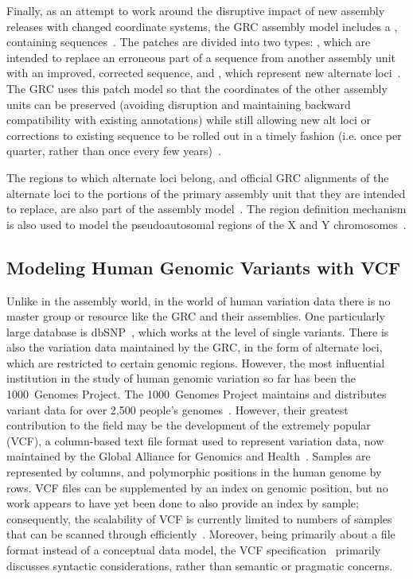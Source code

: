 Finally, as an attempt to work around the disruptive impact of new assembly releases with changed coordinate systems, the GRC assembly model includes a , containing  sequences~\cite{schneider2013genome}. The patches are divided into two types: , which are intended to replace an erroneous part of a sequence from another assembly unit with an improved, corrected sequence, and , which represent new alternate loci~\cite{schneider2013genome}. The GRC uses this patch model so that the coordinates of the other assembly units can be preserved (avoiding disruption and maintaining backward compatibility with existing annotations) while still allowing new alt loci or corrections to existing sequence to be rolled out in a timely fashion (i.e. once per quarter, rather than once every few years)~\cite{schneider2013genome}.

The regions to which alternate loci belong, and official GRC alignments of the alternate loci to the portions of the primary assembly unit that they are intended to replace, are also part of the assembly model~\cite{schneider2013genome}. The region definition mechanism is also used to model the pseudoautosomal regions of the X and Y chromosomes~\cite{schneider2013genome}.
    
\subsection{Modeling Human Genomic Variants with VCF}

Unlike in the assembly world, in the world of human variation data there is no master group or resource like the GRC and their assemblies. One particularly large database is dbSNP~\cite{sherry2001dbsnp}, which works at the level of single variants. There is also the variation data maintained by the GRC, in the form of alternate loci, which are restricted to certain genomic regions. However, the most influential institution in the study of human genomic variation so far has been the 1000~Genomes Project. The 1000~Genomes Project maintains and distributes variant data for over 2,500 people's genomes~\cite{sudmant2015integrated}. However, their greatest contribution to the field may be the development of the extremely popular  (VCF), a column-based text file format used to represent variation data, now maintained by the Global Alliance for Genomics and Health~\cite{danecek2011variant}. Samples are represented by columns, and polymorphic positions in the human genome by rows. VCF files can be supplemented by an index on genomic position, but no work appears to have yet been done to also provide an index by sample; consequently, the scalability of VCF is currently limited to numbers of samples that can be scanned through efficiently~\cite{danecek2011variant}. Moreover, being primarily about a file format instead of a conceptual data model, the VCF specification~\cite{marshall2013variant} primarily discusses syntactic considerations, rather than semantic or pragmatic concerns.

